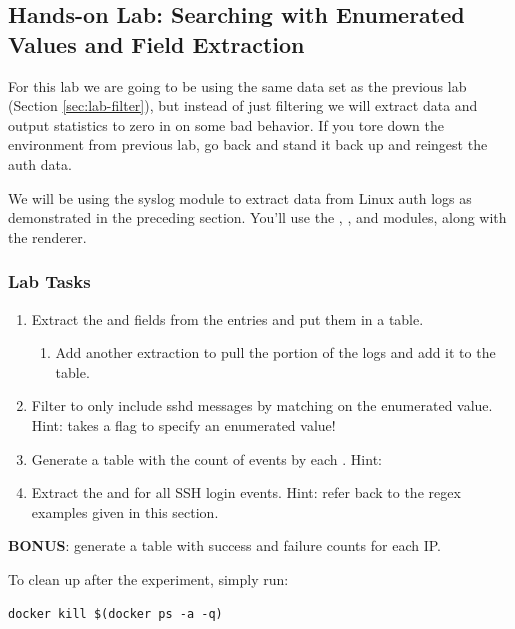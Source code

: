 \clearpage
\subsection{Hands-on Lab: Searching with Enumerated Values and Field Extraction}

For this lab we are going to be using the same data set as the previous lab (Section \ref{sec:lab-filter}), but
instead of just filtering we will extract data and output statistics to
zero in on some bad behavior. If you tore down the environment from
previous lab, go back and stand it back up and reingest the auth data.

We will be using the syslog module to extract data from Linux
auth logs as demonstrated in the preceding section. You'll use
the , , and  modules, along with
the  renderer.

\subsubsection{Lab Tasks}

\begin{enumerate}
\item
  Extract the  and  fields from the entries and put them in a
  table.
	\begin{enumerate}
	\item
	  Add another extraction to pull the  portion of the logs and
	  add it to the table.
	\end{enumerate}
\item
  Filter to only include sshd messages by matching on the  enumerated value. Hint:  takes a  flag to specify an enumerated value!
\item
 Generate a table with the count of  events by each . Hint: 
\item
  Extract the  and  for all SSH login events. Hint: refer back to the regex examples given in this section.
\end{enumerate}

\textbf{BONUS}: generate a table with success and failure counts for each IP.

To clean up after the experiment, simply run:

\begin{Verbatim}[breaklines=true]
docker kill $(docker ps -a -q)
\end{Verbatim}

